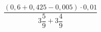 \begin{ex}[type=calculate]
	\begin{condition}
		\( \dfrac{(0,6+0,425-0,005)\cdot0,01}{3\dfrac{5}{9}+3\dfrac{4}{9}} \)
	\end{condition}
\end{ex}
